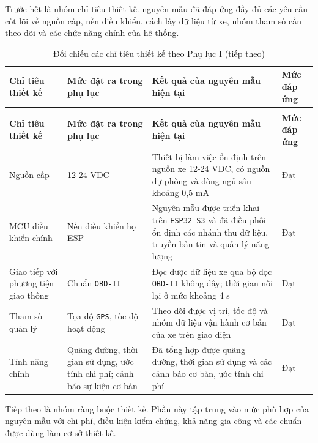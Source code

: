 \documentclass[a4paper]{extarticle}
\newcommand{\thesissettableid}[2]{%
  \renewcommand{\thetable}{#1}%
  \renewcommand{\theHtable}{#2}%
}
\begin{document}
Trước hết là nhóm chỉ tiêu thiết kế. nguyên mẫu đã đáp ứng đầy đủ các yêu cầu cốt lõi về nguồn cấp, nền điều khiển, cách lấy dữ liệu từ xe, nhóm tham số cần theo dõi và các chức năng chính của hệ thống.

{\thesissettableid{4.6}{condensed-r2-bang-4-6-doi-chieu-cac-chi-tieu-thiet-ke-theo-phu-luc-i}
\def\LTcaptype{table}
\begin{longtable}{|L{(\linewidth - 6\tabcolsep) * }|L{(\linewidth - 6\tabcolsep) * }|L{(\linewidth - 6\tabcolsep) * }|L{(\linewidth - 6\tabcolsep) * }|}
\caption{Đối chiếu các chỉ tiêu thiết kế theo Phụ lục I}\label{tab:condensed-r2-bang-4-6-doi-chieu-cac-chi-tieu-thiet-ke-theo-phu-luc-i}\\
\hline
\textbf{Chỉ tiêu thiết kế} & \textbf{Mức đặt ra trong phụ lục} & \textbf{Kết quả của nguyên mẫu hiện tại} & \textbf{Mức đáp ứng} \\
\hline
\endfirsthead
\caption[]{Đối chiếu các chỉ tiêu thiết kế theo Phụ lục I (tiếp theo)}\\
\hline
\textbf{Chỉ tiêu thiết kế} & \textbf{Mức đặt ra trong phụ lục} & \textbf{Kết quả của nguyên mẫu hiện tại} & \textbf{Mức đáp ứng} \\
\hline
\endhead
\endfoot
\endlastfoot
Nguồn cấp & 12-24 VDC & Thiết bị làm việc ổn định trên nguồn xe 12-24 VDC, có nguồn dự phòng và dòng ngủ sâu khoảng 0,5 mA & Đạt \\\hline
MCU điều khiển chính & Nền điều khiển họ ESP & Nguyên mẫu được triển khai trên \texttt{ESP32-S3} và đã điều phối ổn định các nhánh thu dữ liệu, truyền bản tin và quản lý năng lượng & Đạt \\\hline
Giao tiếp với phương tiện giao thông & Chuẩn \texttt{OBD-II} & Đọc được dữ liệu xe qua bộ đọc \texttt{OBD-II} không dây; thời gian nối lại ở mức khoảng 4 s & Đạt \\\hline
Tham số quản lý & Tọa độ \texttt{GPS}, tốc độ hoạt động & Theo dõi được vị trí, tốc độ và nhóm dữ liệu vận hành cơ bản của xe trên giao diện & Đạt \\\hline
Tính năng chính & Quãng đường, thời gian sử dụng, ước tính chi phí; cảnh báo sự kiện cơ bản & Đã tổng hợp được quãng đường, thời gian sử dụng và các cảnh báo cơ bản, ước tính chi phí & Đạt \\\hline
\end{longtable}
}
Tiếp theo là nhóm ràng buộc thiết kế. Phần này tập trung vào mức phù hợp của nguyên mẫu với chi phí, điều kiện kiểm chứng, khả năng gia công và các chuẩn được dùng làm cơ sở thiết kế.
\end{document}
